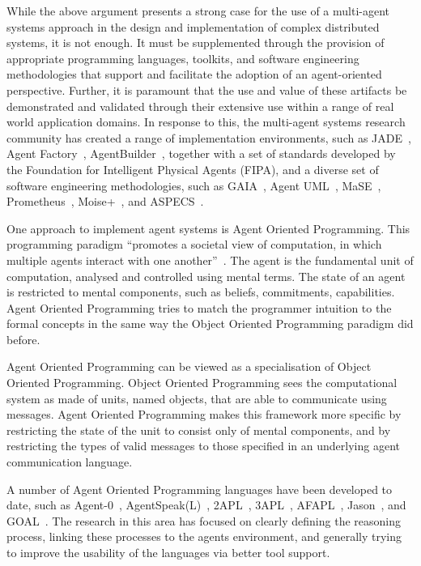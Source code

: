 \documentclass[a4paper,12pt,oneside,fleqn]{book} %
\begin{document}
While the above argument presents a strong case for the use of a multi-agent
systems approach in the design and implementation of complex distributed
systems, it is not enough. It must be supplemented through the provision of
appropriate programming languages, toolkits, and software engineering
methodologies that support and facilitate the adoption of an agent-oriented
perspective. Further, it is paramount that the use and value of these artifacts
be demonstrated and validated through their extensive use within a range of
real world application domains. In response to this, the multi-agent systems
research community has created a range of implementation environments, such as
JADE~\cite{DBLP:books/sp/map2005/BellifemineBCP05}, Agent
Factory~\cite{collier1999agent}, AgentBuilder~\cite{web:agb04},
together with a set of standards developed by the Foundation for
Intelligent Physical Agents (FIPA), and a diverse set of software engineering
methodologies, such as GAIA~\cite{DBLP:journals/aamas/WooldridgeJK00}, Agent
UML~\cite{bauer2001agent}, MaSE~\cite{deloach2001analysis},
Prometheus~\cite{DBLP:conf/atal/PadghamW02}, Moise+~\cite{DBLP:conf/atal/HubnerSB02}, and ASPECS~\cite{DBLP:journals/aamas/CossentinoGHGK10}.

One approach to implement agent systems is Agent Oriented Programming.
This programming paradigm ``promotes a societal view of computation, in
which multiple agents interact with one
another''~\cite{DBLP:journals/ai/Shoham93}.  The agent is the fundamental
unit of computation, analysed and controlled using mental terms.  The state
of an agent is restricted to mental components, such as beliefs,
commitments, capabilities. Agent Oriented Programming tries to match the
programmer intuition to the formal concepts in the same way the Object
Oriented Programming paradigm did before.

Agent Oriented Programming can be viewed as a specialisation of Object
Oriented Programming\null. Object Oriented Programming sees the
computational system as made of units, named objects, that are able to
communicate using messages. Agent Oriented Programming makes this framework
more specific by restricting the state of the unit to consist only of
mental components, and by restricting the types of valid messages to those
specified in an underlying agent communication language.

A number of Agent Oriented Programming languages have been developed to
date, such as Agent-0~\cite{DBLP:journals/ai/Shoham93},
AgentSpeak(L)~\cite{DBLP:conf/maamaw/Rao96},
2APL~\cite{DBLP:journals/aamas/Dastani08},
3APL~\cite{DBLP:conf/promas/DastaniRDM03},
AFAPL~\cite{DBLP:conf/seke/CollierOR04}, 
Jason~\cite{DBLP:books/sp/map2005/BordiniHV05},
and GOAL~\cite{DBLP:journals/corr/cs-AI-0207008}. The research in this area has
focused on clearly defining the reasoning process, linking these processes
to the agents environment, and generally trying to improve the usability of
the languages via better tool support.
\end{document}

